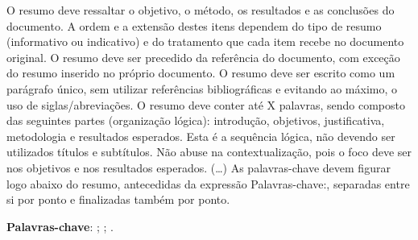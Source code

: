 \setlength{\absparsep}{18pt} %
\begin{resumo}
 O resumo deve ressaltar o
 objetivo, o método, os resultados e as conclusões do documento. A ordem e a extensão
 destes itens dependem do tipo de resumo (informativo ou indicativo) e do
 tratamento que cada item recebe no documento original. O resumo deve ser
 precedido da referência do documento, com exceção do resumo inserido no
 próprio documento. O resumo deve ser escrito como um parágrafo único, sem utilizar referências bibliográficas e evitando ao máximo, o uso de siglas/abreviações. O resumo deve conter até X palavras, sendo composto das seguintes partes (organização lógica): introdução, objetivos, justificativa, metodologia e resultados esperados. Esta é a sequência lógica, não devendo ser utilizados títulos e subtítulos. Não abuse na contextualização, pois o foco deve ser nos objetivos e nos resultados esperados. (\ldots) As palavras-chave devem figurar logo abaixo do
 resumo, antecedidas da expressão Palavras-chave:, separadas entre si por
 ponto e finalizadas também por ponto.

\textbf{Palavras-chave}: \firstkey ; \secondkey ; \thirdkey.
\end{resumo}